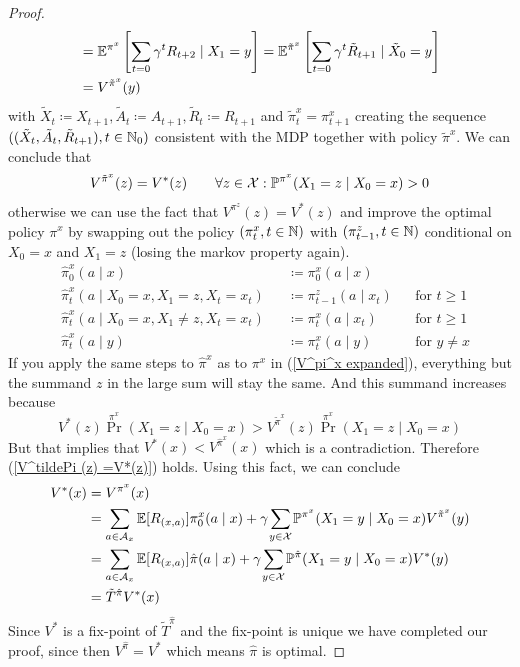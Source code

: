 \begin{proof}
\begin{align}
		&=\mathbb{E}^{\pi^x}\left[\sum_{t=0}\gamma^t R_{t+2}\mid X_1=y\right]
		=\mathbb{E}^{\tilde{\pi}^x}\left[\sum_{t=0}\gamma^t \tilde{R}_{t+1}\mid \tilde{X}_0=y\right]\nonumber\\
		&=V^{\tilde{\pi}^x}(y)
	\end{align}
	with \(\tilde{X}_t\coloneqq X_{t+1}, \tilde{A}_t\coloneqq A_{t+1}, 
	\tilde{R}_t\coloneqq R_{t+1}\) and \(\tilde{\pi}^x_t=\pi^x_{t+1} \) creating the sequence 
	\(((\tilde{X}_t,\tilde{A}_t, \tilde{R}_{t+1}), t\in\mathbb{N}_0)\) consistent with the MDP together with policy \(\tilde{\pi}^x\). We can conclude that 
	\begin{align}
		V^{\tilde{\pi}^x}(z)=V^*(z) \qquad \forall z\in\mathcal{X}:\mathbb{P}^{\pi^x}(X_1=z\mid X_0=x)>0
		\label{V^tildePi (z) =V*(z)}
	\end{align}
	otherwise we can use the fact that \(V^{\pi^z}(z)=V^*(z)\) and improve the optimal policy \(\pi^x\) by swapping out the policy \((\pi^x_t, t\in\mathbb{N}) \) with \((\pi^z_{t-1}, t\in\mathbb{N})\) conditional on \(X_0=x\) and \(X_1=z\) (losing the markov property again).
	\begin{align*}
			&\hat{\pi}^x_0(a\mid x)&&\coloneqq \pi^x_0(a\mid x) \\
			&\hat{\pi}^x_t(a\mid X_0=x,X_1=z, X_t=x_t)&&\coloneqq \pi^z_{t-1}(a\mid x_t) && \text{for } t\ge 1\\
			&\hat{\pi}^x_t(a\mid X_0=x, X_1\neq z, X_t=x_t)&&\coloneqq \pi^x_t(a\mid x_t) && \text{for } t\ge 1 \\
			&\hat{\pi}^x_t(a\mid y)&&\coloneqq \pi^x_t(a\mid y) && \text{for } y\neq x
	\end{align*}
	If you apply the same steps to \(\hat{\pi}^x\) as to \(\pi^x\) in (\ref{V^pi^x expanded}), everything but the summand \(z\) in the large sum will stay the same. And this summand increases because 
	\[
		V^*(z)\Pr^{\pi^x}(X_1=z\mid X_0=x)> V^{\tilde{\pi}^x}(z) \Pr^{\pi^x}(X_1=z\mid X_0=x)
	\]
	But that implies that \(V^*(x)< V^{\hat{\pi}^x}(x)\) which is a contradiction. Therefore (\ref{V^tildePi (z) =V*(z)}) holds. Using this fact, we can conclude
	\begin{align*}
		V^*(x)&=V^{\pi^x}(x)\\
		&=\sum_{a\in\cA_x}\E[R_{(x,a)}]\pi_0^x(a\mid x)+\gamma \smashoperator{\sum_{y\in\cX}}\Pr^{\pi^x}(X_1=y\mid X_0=x)
		V^{\tilde{\pi}^x}(y)\\
		&=\sum_{a\in\cA_x}\E[R_{(x,a)}]\hat{\pi}(a\mid x)+\gamma \smashoperator{\sum_{y\in\cX}}\Pr^{\hat{\pi}}(X_1=y\mid X_0=x) V^*(y)\\
		&=\tilde{T}^{\hat{\pi}} V^* (x)
	\end{align*}
	Since \(V^*\) is a fix-point of \(\tilde{T}^{\hat{\pi}}\) and the fix-point is unique we have completed our proof, since then \(V^{\hat{\pi}}=V^*\) which means \(\hat{\pi}\) is optimal. 
\end{proof}

